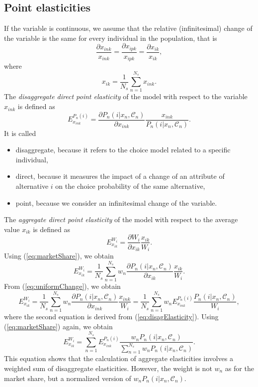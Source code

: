 \documentclass[12pt,a4paper]{article}
\newcommand{\req}[1]{(\ref{#1})}
\newcommand{\C}{\mathcal{C}}
\begin{document}
\subsection{Point elasticities}


If the variable is continuous, we assume that the relative (infinitesimal) change of
the variable is the same for every individual in the population,  that
is
\begin{equation}
  \label{eq:uniformChange}
\frac{\partial x_{ink}}{x_{ink}} = \frac{\partial x_{ipk}}{x_{ipk}} =
\frac{\partial x_{ik}}{x_{ik}},
\end{equation}
where
\begin{equation}
  \label{eq:avgx}
x_{ik} = \frac{1}{N_s} \sum_{n=1}^{N_s}{x_{ink}}.
\end{equation}
The \emph{disaggregate direct point elasticity} of the model with respect to
the variable $x_{ink}$ is defined as
\begin{equation}
\label{eq:disagElasticity}
  E_{x_{ink}}^{P_n(i)} = \frac{\partial P_n(i|x_n, \C_n)}{\partial
  x_{ink}} \frac{x_{ink}}{P_n(i|x_n, \C_n)}.
\end{equation}
It is called
\begin{itemize}
\item disaggregate,  because it refers to the choice model related to a
  specific individual,
\item direct,  because it measures the impact of a change of an
    attribute of alternative $i$ on the choice probability of the
    same alternative,
\item point,  because we consider an infinitesimal change of the
  variable.
\end{itemize}
The \emph{aggregate direct point elasticity} of the model with
respect to the average value $x_{ik}$ is defined as
\begin{equation}
E_{x_{ik}}^{W_i} = \frac{\partial W_i}{\partial x_{ik}} \frac{x_{ik}}{W_i}.
\end{equation}
Using \req{eq:marketShare},  we obtain
\begin{equation}
E_{x_{ik}}^{W_i} = \frac{1}{N_s}  \sum_{n=1}^{N_s} w_n \frac{\partial
  P_n(i|x_n, \C_n)}{\partial x_{ik}} \frac{x_{ik}}{W_i}.
\end{equation}
From \req{eq:uniformChange},  we obtain
\begin{equation}
E_{x_{ik}}^{W_i} = \frac{1}{N_s}  \sum_{n=1}^{N_s} w_n \frac{\partial
  P_n(i|x_n, \C_n)}{\partial x_{ink}} \frac{x_{ink}}{W_i} =
\frac{1}{N_s}  \sum_{n=1}^{N_s} w_n E_{x_{ink}}^{P_n(i)}  \frac{P_n(i|x_n, \C_n)}{W_i},
\end{equation}
where the second equation is derived from \req{eq:disagElasticity}.
Using \req{eq:marketShare} again,  we obtain
\begin{equation}
\label{eq:aggDisagg}
  E_{x_{ik}}^{W_i} =  \sum_{n=1}^{N_s}
E_{x_{ink}}^{P_n(i)}  \frac{w_n P_n(i|x_n, \C_n)}{ \sum_{n=1}^{N_s} w_n P_n(i|x_n, \C_n)}.
\end{equation}
This equation shows that the calculation of aggregate elasticities
involves a weighted sum of disaggregate elasticities. However,  the
weight is not $w_n$ as for the market share,  but a normalized version
of $w_n P_n(i|x_n, \C_n)$.
\end{document}
